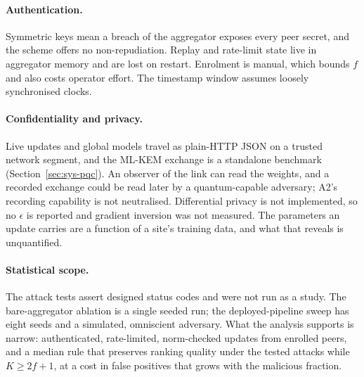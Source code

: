 \paragraph{Authentication.}
Symmetric keys mean a breach of the aggregator exposes every peer secret, and the scheme offers no non-repudiation. Replay and rate-limit state live in aggregator memory and are lost on restart. Enrolment is manual, which bounds $f$ and also costs operator effort. The timestamp window assumes loosely synchronised clocks.

\paragraph{Confidentiality and privacy.}
Live updates and global models travel as plain-HTTP JSON on a trusted network segment, and the ML-KEM exchange is a standalone benchmark (Section~\ref{sec:sys-pqc}). An observer of the link can read the weights, and a recorded exchange could be read later by a quantum-capable adversary; A2's recording capability is not neutralised. Differential privacy is not implemented, so no $\epsilon$ is reported and gradient inversion was not measured. The parameters an update carries are a function of a site's training data, and what that reveals is unquantified.

\paragraph{Statistical scope.}
The attack tests assert designed status codes and were not run as a study. The bare-aggregator ablation is a single seeded run; the deployed-pipeline sweep has eight seeds and a simulated, omniscient adversary. What the analysis supports is narrow: authenticated, rate-limited, norm-checked updates from enrolled peers, and a median rule that preserves ranking quality under the tested attacks while $K\ge 2f+1$, at a cost in false positives that grows with the malicious fraction.
